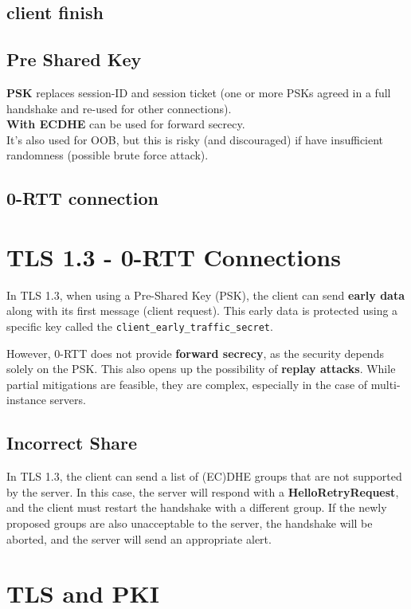 \subsection{client finish}

\subsection{Pre Shared Key}
\textbf{PSK} replaces session-ID and session ticket (one or more PSKs agreed in a full handshake and re-used for 
other connections). \\
\textbf{With ECDHE} can be used for forward secrecy. \\
It's also used for OOB, but this is risky (and discouraged) if have insufficient randomness (possible brute force attack). \\

\subsection{0-RTT connection}
\section*{TLS 1.3 - 0-RTT Connections}

In TLS 1.3, when using a Pre-Shared Key (PSK), the client can send \textbf{early data} along with its first message (client request). This early data is protected using a specific key called the \texttt{client\_early\_traffic\_secret}. 

However, 0-RTT does not provide \textbf{forward secrecy}, as the security depends solely on the PSK. This also opens up the possibility of \textbf{replay attacks}. While partial mitigations are feasible, they are complex, especially in the case of multi-instance servers.

\subsection{Incorrect Share}

In TLS 1.3, the client can send a list of (EC)DHE groups that are not supported by the server. In this case, the server will respond with a \textbf{HelloRetryRequest}, and the client must restart the handshake with a different group.
If the newly proposed groups are also unacceptable to the server, the handshake will be aborted, and the server will send an appropriate alert.

\section{TLS and PKI}

